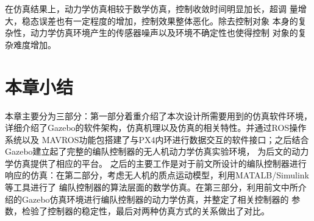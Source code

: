 在仿真结果上，动力学仿真相较于数学仿真，控制收敛时间明显加长，超调
量增大，稳态误差也有一定程度的增加，控制效果整体恶化。除去控制对象
本身的复杂性，动力学仿真环境产生的传感器噪声以及环境不确定性也使得控制
对象的复杂难度增加。
\section{本章小结}
本章主要分为三部分：第一部分着重介绍了本次设计所需要用到的仿真软件环境，详细介绍了Gazebo的软件架构，仿真机理以及仿真的相关特性。并通过ROS操作系统以及
MAVROS功能包搭建了与PX4内环进行数据交互的软件接口；之后结合Gazebo建立起了完整的编队控制器的无人机动力学仿真实验环境，
为后文的动力学仿真提供了相应的平台。
之后的主要工作是对于前文所设计的编队控制器进行响应的仿真：在第二部分，考虑无人机的质点运动模型，利用MATALB/Simulink等工具进行了
编队控制器的算法层面的数学仿真。在第三部分，利用前文中所介绍的Gazebo仿真环境进行编队控制器的动力学仿真，并整定了相关控制器的
参数，检验了控制器的稳定性，最后对两种仿真方式的关系做出了对比。
